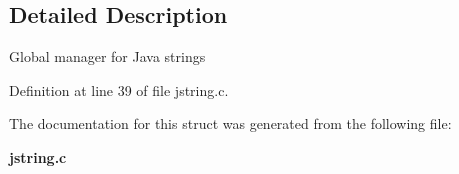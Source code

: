 \subsection{Detailed Description}
Global manager for Java strings 

Definition at line 39 of file jstring.c.



The documentation for this struct was generated from the following file:\begin{DoxyCompactItemize}
\item 
{\bf jstring.c}\end{DoxyCompactItemize}
